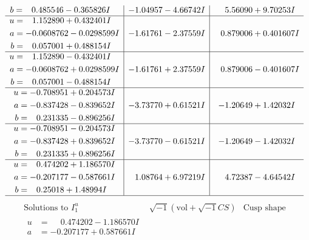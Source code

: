 \documentclass[1p]{elsarticle_modified}
\theoremstyle{definition}
\newcommand{\I}{\sqrt{-1}}
\begin{document}
$$\begin{array}{c|c|c}
\begin{aligned}
b &= \phantom{-}0.485546 - 0.365826 I\end{aligned}
 & -1.04957 - 4.66742 I & \phantom{-}5.56090 + 9.70253 I \\ \hline\begin{aligned}
u &= \phantom{-}1.152890 + 0.432401 I \\
a &= -0.0608762 - 0.0298599 I \\
b &= \phantom{-}0.057001 + 0.488154 I\end{aligned}
 & -1.61761 - 2.37559 I & \phantom{-}0.879006 + 0.401607 I \\ \hline\begin{aligned}
u &= \phantom{-}1.152890 - 0.432401 I \\
a &= -0.0608762 + 0.0298599 I \\
b &= \phantom{-}0.057001 - 0.488154 I\end{aligned}
 & -1.61761 + 2.37559 I & \phantom{-}0.879006 - 0.401607 I \\ \hline\begin{aligned}
u &= -0.708951 + 0.204573 I \\
a &= -0.837428 - 0.839652 I \\
b &= \phantom{-}0.231335 - 0.896256 I\end{aligned}
 & -3.73770 + 0.61521 I & -1.20649 + 1.42032 I \\ \hline\begin{aligned}
u &= -0.708951 - 0.204573 I \\
a &= -0.837428 + 0.839652 I \\
b &= \phantom{-}0.231335 + 0.896256 I\end{aligned}
 & -3.73770 - 0.61521 I & -1.20649 - 1.42032 I \\ \hline\begin{aligned}
u &= \phantom{-}0.474202 + 1.186570 I \\
a &= -0.207177 - 0.587661 I \\
b &= \phantom{-}0.25018 + 1.48994 I\end{aligned}
 & \phantom{-}1.08764 + 6.97219 I & \phantom{-}4.72387 - 4.64542 I\\
 \hline 
 \end{array}$$\newpage$$\begin{array}{c|c|c}  
\text{Solutions to }I^u_{1}& \I (\text{vol} + \sqrt{-1}CS) & \text{Cusp shape}\\
 \hline 
\begin{aligned}
u &= \phantom{-}0.474202 - 1.186570 I \\
a &= -0.207177 + 0.587661 I \\

\end{aligned}
\end{array}$$
\end{document}
